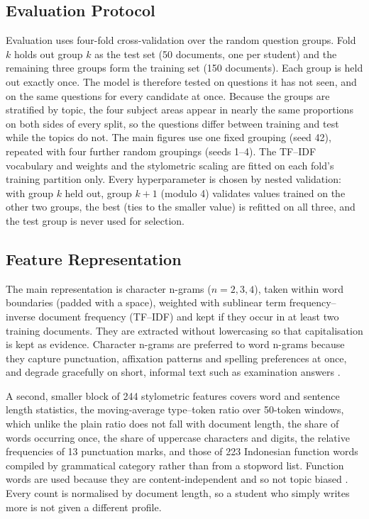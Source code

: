 \documentclass[conference]{IEEEtran}
\begin{document}
\subsection{Evaluation Protocol}

Evaluation uses four-fold cross-validation over the random question groups. Fold $k$ holds out group $k$ as the test set (50 documents, one per student) and the remaining three groups form the training set (150 documents). Each group is held out exactly once. The model is therefore tested on questions it has not seen, and on the same questions for every candidate at once. Because the groups are stratified by topic, the four subject areas appear in nearly the same proportions on both sides of every split, so the questions differ between training and test while the topics do not. The main figures use one fixed grouping (seed 42), repeated with four further random groupings (seeds 1--4). The TF--IDF vocabulary and weights and the stylometric scaling are fitted on each fold's training partition only. Every hyperparameter is chosen by nested validation: with group $k$ held out, group $k+1$ (modulo 4) validates values trained on the other two groups, the best (ties to the smaller value) is refitted on all three, and the test group is never used for selection.

\subsection{Feature Representation}

The main representation is character n-grams ($n = 2, 3, 4$), taken within word boundaries (padded with a space), weighted with sublinear term frequency--inverse document frequency (TF--IDF) and kept if they occur in at least two training documents. They are extracted without lowercasing so that capitalisation is kept as evidence. Character n-grams are preferred to word n-grams because they capture punctuation, affixation patterns and spelling preferences at once, and degrade gracefully on short, informal text such as examination answers \cite{Suljic2024,Tyo2022}.

A second, smaller block of 244 stylometric features covers word and sentence length statistics, the moving-average type--token ratio over 50-token windows, which unlike the plain ratio does not fall with document length, the share of words occurring once, the share of uppercase characters and digits, the relative frequencies of 13 punctuation marks, and those of 223 Indonesian function words compiled by grammatical category rather than from a stopword list. Function words are used because they are content-independent and so not topic biased \cite{He2024}. Every count is normalised by document length, so a student who simply writes more is not given a different profile.
\end{document}
